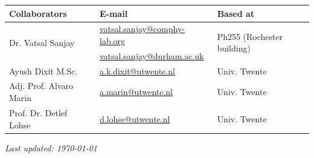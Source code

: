 \documentclass[11pt]{article}
\begin{document}
\begin{center}
\begin{tabular}{|l|l|l|}
\hline \textbf{Collaborators} & \textbf{E-mail} & \textbf{Based at} \\
\hline \multirow{2}{*}{Dr. Vatsal Sanjay} & \href{mailto:vatsal.sanjay@comphy-lab.org}{vatsal.sanjay@comphy-lab.org} & \multirow{2}{*}{Ph255 (Rochester building)} \\
& \href{mailto:vatsal.sanjay@durham.ac.uk}{vatsal.sanjay@durham.ac.uk} & \\
\hline Ayush Dixit M.Sc. & \href{mailto:a.k.dixit@utwente.nl}{a.k.dixit@utwente.nl} & Univ. Twente \\
\hline Adj. Prof. Alvaro Marin & \href{mailto:a.marin@utwente.nl}{a.marin@utwente.nl} & Univ. Twente \\
\hline Prof. Dr. Detlef Lohse & \href{mailto:d.lohse@utwente.nl}{d.lohse@utwente.nl} & Univ. Twente  \\
\hline
\end{tabular}
\end{center}

\vspace{1em}
\noindent\textit{Last updated: \today}

\printbibliography
\end{document}
